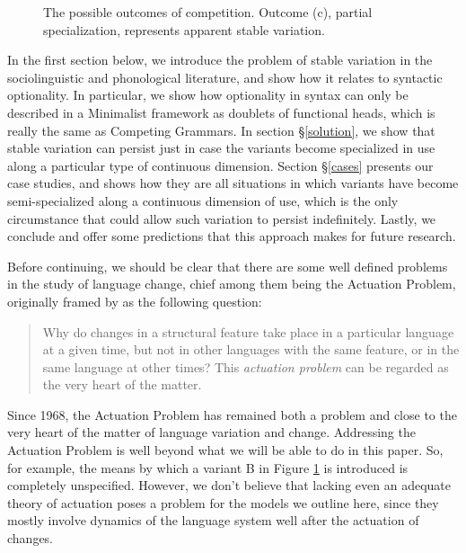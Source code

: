 \begin{figure}[h!tbp]
	\centering
	\qquad
	\qquad
 \caption{The possible outcomes of competition. Outcome (c), partial specialization, represents apparent stable variation.}
 \label{competition_figure_first}
\end{figure}


  
In the first section below, we introduce the problem of stable variation in the sociolinguistic and phonological literature, and show how it relates to syntactic optionality.
In particular, we show how optionality in syntax can only be described in a Minimalist framework as doublets of functional heads, which is really the same as Competing Grammars.
In section \S\ref{solution}, we show that stable variation can persist just in case the variants become specialized in use along a particular type of continuous dimension.
Section \S\ref{cases} presents our case studies, and shows how they are all situations in which variants have become semi-specialized along a continuous dimension of use, which is the only circumstance that could allow such variation to persist indefinitely.
Lastly, we conclude and offer some predictions that this approach makes for future research.


Before continuing, we should be clear that there are some well defined problems in the study of language change, chief among them being the Actuation Problem, originally framed by \citet{wlh1968} as the following question:
	\begin{quote}
		Why do changes in a structural feature take place in a particular language at a given time, but not in other languages with the same feature, or in the same language at other times? This \textsl{actuation problem} can be regarded as the very heart of the matter.
	\end{quote}
Since 1968, the Actuation Problem has remained both a problem and close to the very heart of the matter of language variation and change.
Addressing the Actuation Problem is well beyond what we will be able to do in this paper.
So, for example, the means by which a variant B in Figure \ref{competition_figure_first} is introduced is completely unspecified.
However, we don't believe that lacking even an adequate theory of actuation poses a problem for the models we outline here, since they mostly involve dynamics of the language system well after the actuation of changes.

